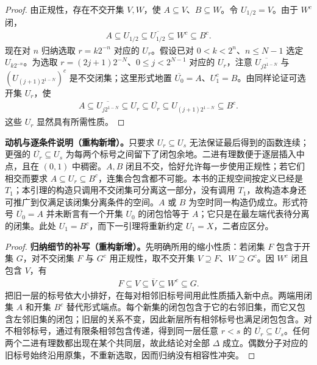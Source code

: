 \documentclass[../../main.tex]{subfiles}%
\begin{document}
\begin{proof}
由正规性，存在不交开集 $V,W$，使 $A\subseteq V$、$B\subseteq W$。令 $U_{1/2}=V$。由于 $W^c$ 闭，
\begin{align*}
A\subseteq U_{1/2}\subseteq\overline{U_{1/2}}\subseteq W^c\subseteq B^c.
\end{align*}
现在对 $n$ 归纳选取 $r=k2^{-n}$ 对应的 $U_r$。假设已对 $0<k<2^n$、$n\le N-1$ 选定 $U_{k2^{-n}}$。为选取 $r=(2j+1)2^{-N}$、$0\le j<2^{N-1}$ 对应的 $U_r$，注意 $\overline{U_{j2^{1-N}}}$ 与 $(U_{(j+1)2^{1-N}})^c$ 是不交闭集；这里形式地置 $\overline{U_0}=A$、$U_1^c=B$。由同样论证可选开集 $U_r$，使
\begin{align*}
A\subseteq\overline{U_{j2^{1-N}}}\subseteq U_r
\subseteq\overline{U_r}\subseteq U_{(j+1)2^{1-N}}\subseteq B^c.
\end{align*}
这些 $U_r$ 显然具有所需性质。
\end{proof}
\begin{remark}
\textbf{动机与逐条件说明（重构新增）。}只要求 $U_r\subseteq U_s$ 无法保证最后得到的函数连续；更强的 $\overline{U_r}\subseteq U_s$ 为每两个标号之间留下了闭包余地。二进有理数便于逐层插入中点，且在 $(0,1)$ 中稠密。$A,B$ 闭且不交，恰好允许每一步使用正规性；若它们相交而要求 $A\subseteq U_r\subseteq B^c$，连集合包含都不可能。本书的正规空间按定义已经是 $T_1$；本引理的构造只调用不交闭集可分离这一部分，没有调用 $T_1$，故构造本身还可推广到仅满足该闭集分离条件的空间。$A$ 或 $B$ 为空时同一构造仍成立。形式符号 $\overline{U_0}=A$ 并未断言有一个开集 $U_0$ 的闭包恰等于 $A$；它只是在最左端代表待分离的闭集。此处 $U_1=B^c$，而下一引理将重新约定 $U_1=X$，二者应区分。
\end{remark}
\begin{proof}
\textbf{归纳细节的补写（重构新增）。}先明确所用的缩小性质：若闭集 $F$ 包含于开集 $G$，对不交闭集 $F$ 与 $G^c$ 用正规性，取不交开集 $V\supseteq F$、$W\supseteq G^c$。因 $W^c$ 闭且包含 $V$，有
\begin{align*}
F\subseteq V\subseteq\overline V\subseteq W^c\subseteq G.
\end{align*}
把旧一层的标号依大小排好，在每对相邻旧标号间用此性质插入新中点。两端用闭集 $A$ 和开集 $B^c$ 替代形式端点。每个新集的闭包包含于它的右邻旧集，而它又包含左邻旧集的闭包；旧层的关系不变，因此新层所有相邻标号也满足闭包包含。对不相邻标号，通过有限条相邻包含传递，得到同一层任意 $r<s$ 的 $\overline{U_r}\subseteq U_s$。任何两个二进有理数都出现在某个共同层，故此结论对全部 $\Delta$ 成立。偶数分子对应的旧标号始终沿用原集，不重新选取，因而归纳没有相容性冲突。
\end{proof}
\end{document}
